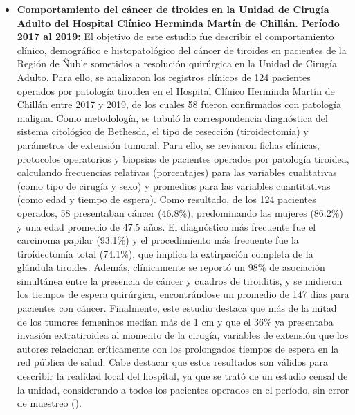 \begin{itemize}
\item \textbf{Comportamiento del cáncer de tiroides en la Unidad de Cirugía Adulto del Hospital Clínico Herminda Martín de Chillán. Período 2017 al 2019:} El objetivo de este estudio fue describir el comportamiento clínico, demográfico e histopatológico del cáncer de tiroides en pacientes de la Región de Ñuble sometidos a resolución quirúrgica en la Unidad de Cirugía Adulto. Para ello, se analizaron los registros clínicos de 124 pacientes operados por patología tiroidea en el Hospital Clínico Herminda Martín de Chillán entre 2017 y 2019, de los cuales 58 fueron confirmados con patología maligna. Como metodología, se tabuló la correspondencia diagnóstica del sistema citológico de Bethesda, el tipo de resección (tiroidectomía) y parámetros de extensión tumoral. Para ello, se revisaron fichas clínicas, protocolos operatorios y biopsias de pacientes operados por patología tiroidea, calculando frecuencias relativas (porcentajes) para las variables cualitativas (como tipo de cirugía y sexo) y promedios para las variables cuantitativas (como edad y tiempo de espera). Como resultado, de los 124 pacientes operados, 58 presentaban cáncer (46.8\%), predominando las mujeres (86.2\%) y una edad promedio de 47.5 años. El diagnóstico más frecuente fue el carcinoma papilar (93.1\%) y el procedimiento más frecuente fue la tiroidectomía total (74.1\%), que implica la extirpación completa de la glándula tiroides. Además, clínicamente se reportó un 98\% de asociación simultánea entre la presencia de cáncer y cuadros de tiroiditis, y se midieron los tiempos de espera quirúrgica, encontrándose un promedio de 147 días para pacientes con cáncer. Finalmente, este estudio destaca que más de la mitad de los tumores femeninos medían más de 1 cm y que el 36\% ya presentaba invasión extratiroidea al momento de la cirugía, variables de extensión que los autores relacionan críticamente con los prolongados tiempos de espera en la red pública de salud. Cabe destacar que estos resultados son válidos para describir la realidad local del hospital, ya que se trató de un estudio censal de la unidad, considerando a todos los pacientes operados en el período, sin error de muestreo (\cite{scielo3}).

\end{itemize}
